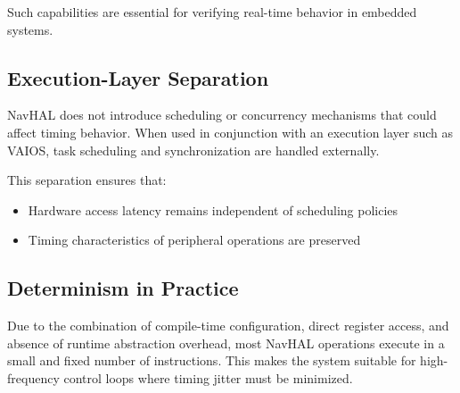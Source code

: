 Such capabilities are essential for verifying real-time behavior in embedded systems.

\subsection*{Execution-Layer Separation}

NavHAL does not introduce scheduling or concurrency mechanisms that could affect timing behavior. When used in conjunction with an execution layer such as VAIOS, task scheduling and synchronization are handled externally.

This separation ensures that:
\begin{itemize}
    \item Hardware access latency remains independent of scheduling policies
    \item Timing characteristics of peripheral operations are preserved
\end{itemize}

\subsection*{Determinism in Practice}

Due to the combination of compile-time configuration, direct register access, and absence of runtime abstraction overhead, most NavHAL operations execute in a small and fixed number of instructions. This makes the system suitable for high-frequency control loops where timing jitter must be minimized.

